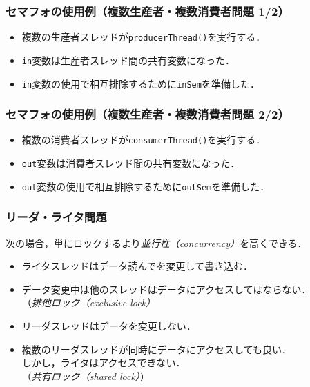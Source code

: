 \documentclass[unicode]{beamer}                   %
\begin{document}
\begin{frame}
  \frametitle{セマフォの使用例（複数生産者・複数消費者問題 1/2）}
  \begin{itemize}
  \item 複数の生産者スレッドが\texttt{producerThread()}を実行する．
  \item \texttt{in}変数は生産者スレッド間の共有変数になった．
  \item \texttt{in}変数の使用で相互排除するために\texttt{inSem}を準備した．
  \end{itemize}
  \vfill
\end{frame}

\begin{frame}
  \frametitle{セマフォの使用例（複数生産者・複数消費者問題 2/2）}
  \begin{itemize}
  \item 複数の消費者スレッドが\texttt{consumerThread()}を実行する．
  \item \texttt{out}変数は消費者スレッド間の共有変数になった．
  \item \texttt{out}変数の使用で相互排除するために\texttt{outSem}を準備した．
  \end{itemize}
  \vfill
\end{frame}

\begin{frame}
  \frametitle{リーダ・ライタ問題}
  次の場合，単にロックするより\emph{並行性（concurrency）}を高くできる．
  \vfill
  \begin{itemize}
  \item ライタスレッドはデータ読んでを変更して書き込む．
  \item データ変更中は他のスレッドはデータにアクセスしてはならない．\\
    （\emph{排他ロック（exclusive lock）}
      \vfill
  \item リーダスレッドはデータを変更しない．
  \item 複数のリーダスレッドが同時にデータにアクセスしても良い．\\
    しかし，ライタはアクセスできない．\\
    （\emph{共有ロック（shared lock）}）
  \end{itemize}
  \vfill
\end{frame}
\end{document}
